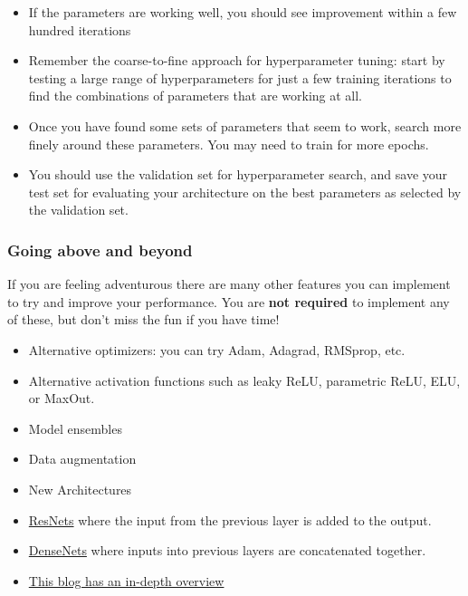 \documentclass[11pt]{article}
\providecommand{\tightlist}{%
      \setlength{\itemsep}{0pt}\setlength{\parskip}{0pt}}
\begin{document}
\begin{itemize}
\tightlist
\item
  If the parameters are working well, you should see improvement within
  a few hundred iterations
\item
  Remember the coarse-to-fine approach for hyperparameter tuning: start
  by testing a large range of hyperparameters for just a few training
  iterations to find the combinations of parameters that are working at
  all.
\item
  Once you have found some sets of parameters that seem to work, search
  more finely around these parameters. You may need to train for more
  epochs.
\item
  You should use the validation set for hyperparameter search, and save
  your test set for evaluating your architecture on the best parameters
  as selected by the validation set.
\end{itemize}

\subsubsection{Going above and beyond}\label{going-above-and-beyond}

If you are feeling adventurous there are many other features you can
implement to try and improve your performance. You are \textbf{not
required} to implement any of these, but don't miss the fun if you have
time!

\begin{itemize}
\tightlist
\item
  Alternative optimizers: you can try Adam, Adagrad, RMSprop, etc.
\item
  Alternative activation functions such as leaky ReLU, parametric ReLU,
  ELU, or MaxOut.
\item
  Model ensembles
\item
  Data augmentation
\item
  New Architectures
\item
  \href{https://arxiv.org/abs/1512.03385}{ResNets} where the input from
  the previous layer is added to the output.
\item
  \href{https://arxiv.org/abs/1608.06993}{DenseNets} where inputs into
  previous layers are concatenated together.
\item
  \href{https://chatbotslife.com/resnets-highwaynets-and-densenets-oh-my-9bb15918ee32}{This
  blog has an in-depth overview}
\end{itemize}
\end{document}
